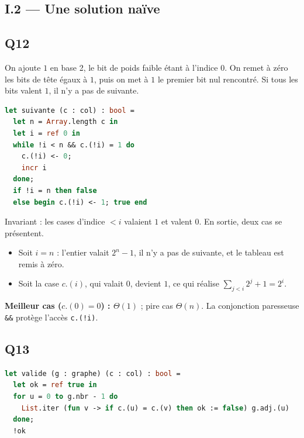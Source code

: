 \documentclass[11pt,a4paper]{article}
\providecommand{\tightlist}{\setlength{\itemsep}{0pt}\setlength{\parskip}{0pt}}
\begin{document}
\hypertarget{i.2-une-solution-nauxefve}{%
\subsection{I.2 --- Une solution naïve}\label{i.2-une-solution-nauxefve}}

\hypertarget{q12}{%
\subsection{Q12}\label{q12}}

On ajoute \(1\) en base 2, le bit de poids faible étant à l'indice \(0\). On remet à zéro les bits de tête égaux à \(1\), puis on met à \(1\) le premier bit nul rencontré. Si tous les bits valent \(1\), il n'y a pas de suivante.

\begin{lstlisting}[language=Caml]
let suivante (c : col) : bool =
  let n = Array.length c in
  let i = ref 0 in
  while !i < n && c.(!i) = 1 do
    c.(!i) <- 0;
    incr i
  done;
  if !i = n then false
  else begin c.(!i) <- 1; true end
\end{lstlisting}

Invariant : les cases d'indice \(< i\) valaient \(1\) et valent \(0\). En sortie, deux cas se présentent.

\begin{itemize}
\tightlist
\item
  Soit \(i = n\) : l'entier valait \(2^n - 1\), il n'y a pas de suivante, et le tableau est remis à zéro.
\item
  Soit la case \(c.(i)\), qui valait \(0\), devient \(1\), ce qui réalise \(\sum_{j<i} 2^j + 1 = 2^i\).
\end{itemize}

\textbf{Meilleur cas (\(c.(0) = 0\)) : \(\Theta(1)\)} ; pire cas \(\Theta(n)\). La conjonction paresseuse \texttt{\&\&} protège l'accès \texttt{c.(!i)}.

\hypertarget{q13}{%
\subsection{Q13}\label{q13}}

\begin{lstlisting}[language=Caml]
let valide (g : graphe) (c : col) : bool =
  let ok = ref true in
  for u = 0 to g.nbr - 1 do
    List.iter (fun v -> if c.(u) = c.(v) then ok := false) g.adj.(u)
  done;
  !ok
\end{lstlisting}
\end{document}
